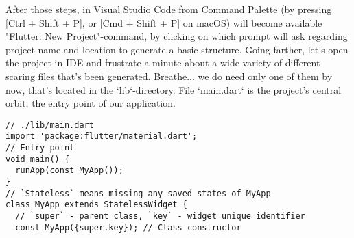 After those steps, in Visual Studio Code from Command Palette (by pressing [Ctrl + Shift + P], or [Cmd + Shift + P] 
on macOS) will become available "Flutter: New Project"-command, by clicking on which prompt will ask regarding project 
name and location to generate a basic structure. Going farther, let's open the project in IDE and frustrate a minute 
about a wide variety of different scaring files that's been generated. Breathe... we do need only one of them by 
now, that's located in the `lib`-directory. File `main.dart` is the project's central orbit, the entry point of our 
application.

\begin{lstlisting}
// ./lib/main.dart
import 'package:flutter/material.dart';
// Entry point
void main() {
  runApp(const MyApp());
}
// `Stateless` means missing any saved states of MyApp
class MyApp extends StatelessWidget {
  // `super` - parent class, `key` - widget unique identifier
  const MyApp({super.key}); // Class constructor
  

\end{lstlisting}
